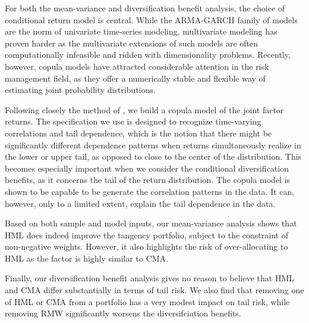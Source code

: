 For both the mean-variance and diversification benefit analysis, the choice of conditional return model is central. While the ARMA-GARCH family of models are the norm of univariate time-series modeling, multivariate modeling has proven harder as the multivariate extensions of such models are often computationally infeasible and ridden with dimensionality problems. Recently, however, copula models have attracted considerable attention in the risk management field, as they offer a numerically stable and flexible way of estimating joint probability distributions. 

Following closely the method of \textcite{ChristoffersenLanglois2013}, we build a copula model of the joint factor returns. The specification we use is designed to recognize time-varying correlations and tail dependence, which is the notion that there might be significantly different dependence patterns when returns simultaneously realize in the lower or upper tail, as opposed to close to the center of the distribution. This becomes especially important when we consider the conditional diversification benefits, as it concerns the tail of the return distribution. The copula model is shown to be capable to be generate the correlation patterns in the data. It can, however, only to a limited extent, explain the tail dependence in the data.

Based on both sample and model inputs, our mean-variance analysis shows that HML does indeed improve the tangency portfolio, subject to the constraint of non-negative weights. However, it also highlights the risk of over-allocating to HML as the factor is highly similar to CMA.

Finally, our diversification benefit analysis gives no reason to believe that HML and CMA differ substantially in terms of tail risk. We also find that removing one of HML or CMA from a portfolio has a very modest impact on tail risk, while removing RMW significantly worsens the diversifciation benefits.

 
